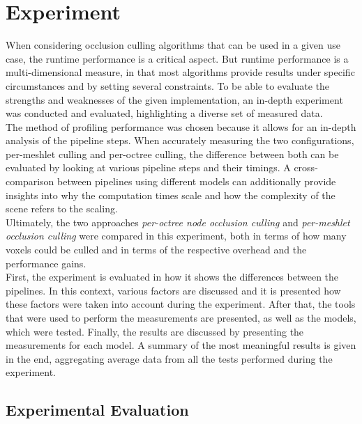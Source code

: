 \chapter{Experiment} \label{cpt-experiment}

When considering occlusion culling algorithms that can be used in a given use case, the runtime 
performance is a critical aspect. But runtime performance is a multi-dimensional measure, in that 
most algorithms provide results under specific circumstances and by setting several constraints.
To be able to evaluate the strengths and weaknesses of the given implementation, an in-depth  
experiment was conducted and evaluated, highlighting a diverse set of measured data. \\ 

\noindent
The method of profiling performance was chosen because it allows for an in-depth analysis of the 
pipeline steps. When accurately measuring the two configurations, per-meshlet culling and 
per-octree culling, the difference between both can be evaluated by looking at various pipeline 
steps and their timings. A cross-comparison between pipelines using different models can additionally 
provide insights into why the computation times scale and how the complexity of the scene refers to 
the scaling.\\

\noindent
Ultimately, the two approaches \emph{per-octree node occlusion culling} and \emph{per-meshlet occlusion culling} 
were compared in this experiment, both in terms of how many voxels could be culled and in terms of the respective 
overhead and the performance gains. \\

\noindent
First, the experiment is evaluated in how it shows the differences between the pipelines. In this context, various 
factors are discussed and it is presented how these factors were taken into account during the experiment. After 
that, the tools that were used to perform the measurements are presented, as well as the models, which were tested.
Finally, the results are discussed by presenting the measurements for each model. A summary of the most meaningful 
results is given in the end, aggregating average data from all the tests performed during the experiment.

\section{Experimental Evaluation} \label{sec-experimental-evaluation}

